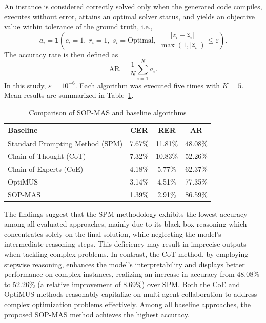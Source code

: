\documentclass[preprint,12pt]{elsarticle}
\begin{document}
An instance is considered correctly solved only when the generated code compiles, executes without error, attains an optimal solver status, and yields an objective value within tolerance of the ground truth, i.e.,
\begin{equation}
a_i=\mathbf{1}\!\left(c_i=1,\; r_i=1,\; s_i=\mathrm{Optimal},\; \frac{|z_i-\hat z_i|}{\max(1,|\hat z_i|)}\le \varepsilon\right).
\end{equation}
The accuracy rate is then defined as
\begin{equation}
\mathrm{AR}=\frac{1}{N}\sum_{i=1}^{N} a_i.
\end{equation}
In this study, $\varepsilon = 10^{-6}$. Each algorithm was executed five times with $K=5$. Mean results are summarized in Table~\ref{tab:benchmark}.


\begin{table}[t]%
\caption{Comparison of SOP-MAS and baseline algorithms}\label{tab:benchmark}

\centering%
\begin{tabular}{l c c c}
\toprule
Baseline & CER & RER & AR \\
\midrule
Standard Prompting Method (SPM) & 7.67\% & 11.81\% & 48.08\% \\
Chain-of-Thought (CoT) & 7.32\% & 10.83\% & 52.26\% \\
Chain-of-Experts (CoE) & 4.18\% & 5.77\% & 62.37\% \\
OptiMUS & 3.14\% & 4.51\% & 77.35\% \\
SOP-MAS & 1.39\% & 2.91\% & 86.59\% \\
\bottomrule
\end{tabular}
\end{table}


The findings suggest that the SPM methodology exhibits the lowest accuracy among all evaluated approaches, mainly due to its black-box reasoning which concentrates solely on the final solution, while neglecting the model's intermediate reasoning steps. This deficiency may result in imprecise outputs when tackling complex problems. In contrast, the CoT method, by employing stepwise reasoning, enhances the model's interpretability and displays better performance on complex instances, realizing an increase in accuracy from 48.08\% to 52.26\% (a relative improvement of 8.69\%) over SPM. Both the CoE and OptiMUS methods reasonably capitalize on multi-agent collaboration to address complex optimization problems effectively. Among all baseline approaches, the proposed SOP-MAS method achieves the highest accuracy.
\end{document}
